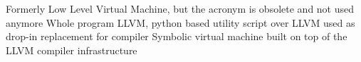   {Formerly Low Level Virtual Machine, but the acronym
               is obsolete and not used anymore}
 {Whole program LLVM, python based utility script over LLVM
               used as drop-in replacement for compiler}
  {Symbolic virtual machine built on top of the LLVM compiler
               infrastructure}
